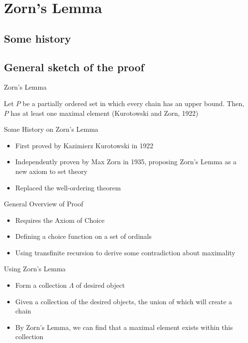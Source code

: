\documentclass{beamer}
\begin{document}
\section{Zorn's Lemma}

\subsection{Some history}
\subsection{General sketch of the proof}

\begin{frame}{Zorn's Lemma}
  \begin{lemma}
  Let $P$ be a partially ordered set in which every chain has an upper bound. Then, $P$ has at least one maximal element (Kurotowski and Zorn, 1922)
  \end{lemma}
\end{frame}

\begin{frame}{Some History on Zorn's Lemma}
    \begin{itemize}
        \item First proved by Kazimierz Kurotowski in 1922
        \item Independently proven by Max Zorn in 1935, proposing Zorn's Lemma as a new axiom to set theory
        \item Replaced the well-ordering theorem
    \end{itemize}
\end{frame}

\begin{frame}{General Overview of Proof}
    \begin{itemize}
        \item {Requires the Axiom of Choice}
    \end{itemize}
    \begin{itemize}
        \item {Defining a choice function on a set of ordinals}
    \end{itemize}
    \begin{itemize}
        \item {Using transfinite recursion to derive some contradiction about maximality}
    \end{itemize}
\end{frame}

\begin{frame}{Using Zorn's Lemma}
  \begin{itemize}
      \item {Form a collection $\Lambda$ of desired object}
      \item Given a collection of the desired objects, the union of which will create a chain
      \item By Zorn's Lemma, we can find that a maximal element exists within this collection
  \end{itemize}
\end{frame}
\end{document}
